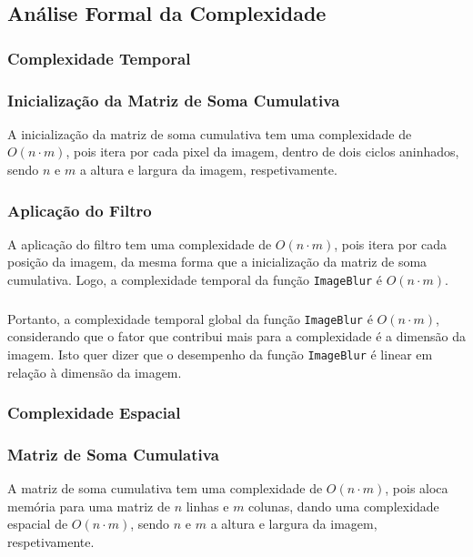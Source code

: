 \documentclass{report}
\begin{document}
\subsection{Análise Formal da Complexidade}

\subsubsection{Complexidade Temporal}

\subsubsection{Inicialização da Matriz de Soma Cumulativa}
A inicialização da matriz de soma cumulativa tem uma complexidade de \(O(n \cdot m)\), pois itera por cada pixel da imagem,
dentro de dois ciclos aninhados, sendo \(n\) e \(m\) a altura e largura da imagem, respetivamente.

\subsubsection{Aplicação do Filtro}
A aplicação do filtro tem uma complexidade de \(O(n \cdot m)\), pois itera por cada posição da imagem, da mesma forma que a inicialização 
da matriz de soma cumulativa. Logo, a complexidade temporal da função \texttt{ImageBlur} é \(O(n \cdot m)\).
\par
\subsubsection{}
Portanto, a complexidade temporal global da função \texttt{ImageBlur} é \(O(n \cdot m)\), considerando que o fator que contribui mais para a complexidade 
é a dimensão da imagem. Isto quer dizer que o desempenho da função \texttt{ImageBlur} é linear em relação à dimensão da imagem.


\subsubsection{Complexidade Espacial}

\subsubsection{Matriz de Soma Cumulativa}
A matriz de soma cumulativa tem uma complexidade de \(O(n \cdot m)\), pois aloca memória para uma matriz de \(n\) linhas e \(m\) colunas, 
dando uma complexidade espacial de \(O(n \cdot m)\), sendo \(n\) e \(m\) a altura e largura da imagem, respetivamente.
\end{document}

